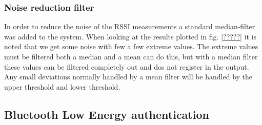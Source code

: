 

\subsubsection{Noise reduction filter}
In order to reduce the noise of the RSSI measurements a standard median-filter was added to the system.
When looking at the results plotted in fig. \ref{?????} it is noted that we get some noise with few a few extreme values.
The extreme values must be filtered both a median and a mean can do this, but with a median filter these values can be filtered completely out and dos not register in the output. Any small deviations normally handled by a mean filter will be handled by the upper threshold and lower threshold.

\subsection{Bluetooth Low Energy authentication}
